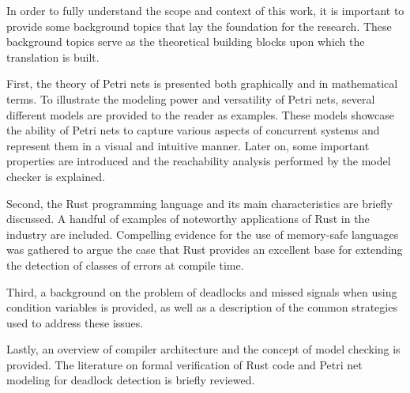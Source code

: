 \documentclass[../Thesis.tex]{subfiles}
\begin{document}
In order to fully understand the scope and context of this work,
it is important to provide some background topics
that lay the foundation for the research.
These background topics serve as the theoretical building blocks
upon which the translation is built.

First, the theory of Petri nets is presented both graphically and in mathematical terms.
To illustrate the modeling power and versatility of Petri nets,
several different models are provided to the reader as examples.
These models showcase the ability of Petri nets
to capture various aspects of concurrent systems
and represent them in a visual and intuitive manner.
Later on, some important properties are introduced and the reachability analysis
performed by the model checker is explained.

Second, the Rust programming language and
its main characteristics are briefly discussed.
A handful of examples of noteworthy applications of Rust in the industry are included.
Compelling evidence for the use of memory-safe languages was gathered to argue
the case that Rust provides an excellent base
for extending the detection of classes of errors at compile time.

Third, a background on the problem of deadlocks and missed signals when using condition variables is provided,
as well as a description of the common strategies used to address these issues.

Lastly, an overview of compiler architecture
and the concept of model checking is provided.
The literature on formal verification of Rust code
and Petri net modeling for deadlock detection is briefly reviewed.
\end{document}
